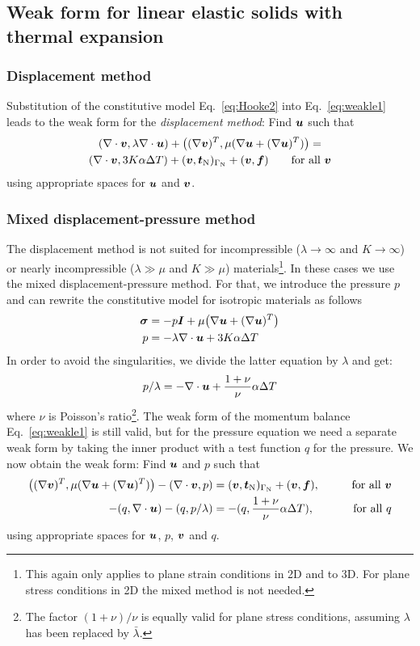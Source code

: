 \subsection{Weak form for linear elastic solids with thermal expansion}
\subsubsection{Displacement method}
Substitution of the constitutive model Eq.~\eqref{eq:Hooke2} into Eq.~\eqref{eq:weakle1} leads to the weak form for the \emph{displacement method}: Find $\boldsymbol{u}$ such that
\begin{multline}
  (\nabla\cdot\boldsymbol{v},\lambda\nabla\cdot\boldsymbol{u})+\big((\nabla\boldsymbol{v})^T,\mu(\nabla\boldsymbol{u}+(\nabla\boldsymbol{u})^T)\big)=\\(\nabla\cdot\boldsymbol{v},3K\alpha\Delta T)+(\boldsymbol{v},\boldsymbol{t}_{\text{N}})_{\Gamma_{\text{N}}}+(\boldsymbol{v},\boldsymbol{f})
\qquad\text{for all }\boldsymbol{v}\label{eq:weakle5}
\end{multline}
using appropriate spaces for $\boldsymbol{u}$ and $\boldsymbol{v}$.

\subsubsection{Mixed displacement-pressure method}

The displacement method is not suited for incompressible ($\lambda\rightarrow\infty$ and 
$K\rightarrow\infty$) or nearly incompressible ($\lambda\gg\mu$ and $K\gg\mu$) materials\footnote{This again only applies to plane strain conditions in 2D and to 3D. For plane stress conditions in 2D the mixed method is not needed.}. In these cases we use the mixed displacement-pressure method.
For that, we introduce the pressure $p$ and can rewrite the constitutive model for isotropic materials as follows
\begin{align}
  \boldsymbol{\sigma} &= -p\boldsymbol{I}+\mu\big(\nabla\boldsymbol{u}+(\nabla\boldsymbol{u})^T\big)\\
  p&=-\lambda\nabla\cdot\boldsymbol{u}+3K\alpha\Delta T
\end{align}
In order to avoid the singularities, we divide the latter equation by $\lambda$ and get:
\begin{equation}
   p/\lambda=-\nabla\cdot\boldsymbol{u}+\frac{1+\nu}{\nu}\alpha\Delta T
\end{equation}
where $\nu$ is Poisson's ratio\footnote{The factor $(1+\nu)/\nu$ is equally valid for plane stress conditions, assuming $\lambda$ has been replaced by $\bar\lambda$.}.
The weak form of the momentum balance Eq.~\eqref{eq:weakle1} is still valid, but for the pressure equation we need a separate weak form by taking the inner product with a test function $q$ for the pressure. We now obtain the weak form: Find $\boldsymbol{u}$ and $p$ such that
\begin{alignat}{2}
 \big((\nabla\boldsymbol{v})^T,\mu(\nabla\boldsymbol{u}+(\nabla\boldsymbol{u})^T)\big)-(\nabla\cdot\boldsymbol{v},p)&=(\boldsymbol{v},\boldsymbol{t}_{\text{N}})_{\Gamma_{\text{N}}}+(\boldsymbol{v},\boldsymbol{f}),\qquad&\text{for all }\boldsymbol{v}\label{eq:weakle6}\\
    -(q,\nabla\cdot\boldsymbol{u})-(q,p/\lambda) &=-(q,\frac{1+\nu}{\nu}\alpha\Delta T),\qquad&\text{for all }q\label{eq:weakle7}
\end{alignat}
using appropriate spaces for $\boldsymbol{u}$, $p$, $\boldsymbol{v}$ and $q$. 


